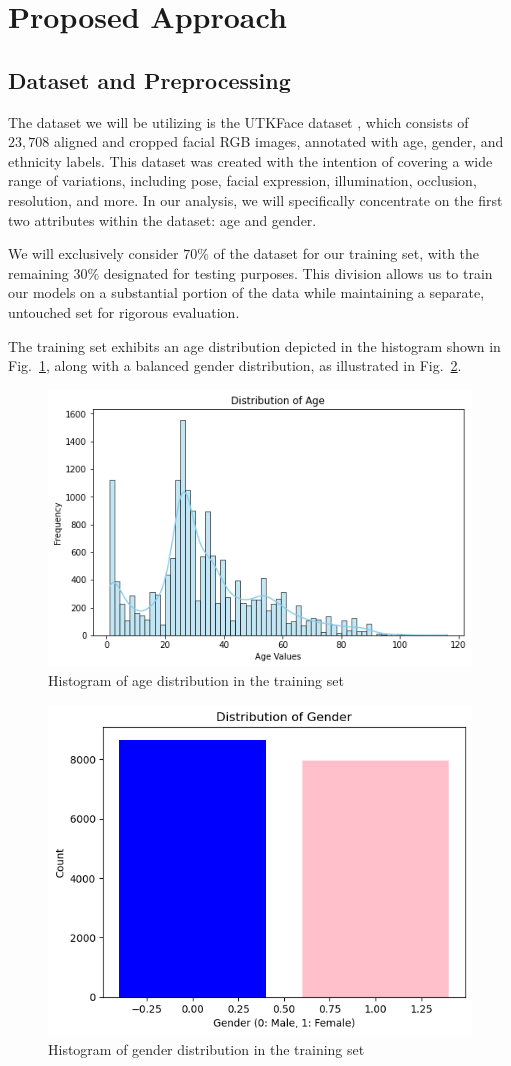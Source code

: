 \section{Proposed Approach} \label{sec:approach}
 
\subsection{Dataset and Preprocessing} \label{sec:dataset}

The dataset we will be utilizing is the UTKFace dataset \cite{app1},
which consists of $23,708$ aligned and cropped facial RGB images, 
annotated with age, gender, and ethnicity labels.
This dataset was created with the intention of covering
a wide range of variations, including pose, facial expression,
illumination, occlusion, resolution, and more.
In our analysis, we will specifically concentrate
on the first two attributes within the dataset: age and gender. 

We will exclusively consider $70\%$
of the dataset for our training set, with the remaining
$30\%$ designated for testing purposes.
This division allows us to train our models on a substantial
portion of the data while maintaining a separate,
untouched set for rigorous evaluation.

The training set exhibits an age distribution depicted
in the histogram
shown in Fig.~\ref{1age}, along with a balanced gender distribution,
as illustrated in Fig.~\ref{2gender1}.

\begin{figure}[htbp]
    \centerline{\includegraphics[width=.5\textwidth]{images/dataset/age.png}}
    \caption{Histogram of age distribution in the training set}
    \label{1age}
\end{figure}

\begin{figure}[htbp]
    \centerline{\includegraphics[width=.4\textwidth]{images/dataset/gender1.png}}
    \caption{Histogram of gender distribution in the training set}
    \label{2gender1}
\end{figure}

